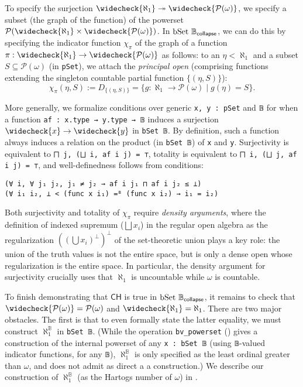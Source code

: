 \documentclass[sigplan,10pt,review, anonymous]{acmart}
\newcommand{\lil}{\lstinline}
\newcommand{\CH}{\mathsf{CH}}
\theoremstyle{definition}
\begin{document}
To specify the surjection \(\widecheck{\aleph_1} \twoheadrightarrow \widecheck{\mathcal{P}(\omega)}\), we specify a subset (the graph of the function) of the powerset \(\mathcal{P}(\widecheck{\aleph_1} \times \widecheck{\mathcal{P}(\omega)})\).
In \(\text{\lil{bSet}}\ \mathbb{B}_{\mathsf{collapse}}\), we can do this by specifying the indicator function \(\chi_{\pi}\) of the graph of a function \(\pi : \widecheck{\aleph_1} \to \widecheck{\mathcal{P}(\omega)}\) as follows: to an \(\eta < \aleph_1\) and a subset \(S \subseteq \mathcal{P}(\omega)\) (in \lil{pSet}), we attach the \emph{principal open} (comprising functions extending the singleton countable partial function \(\{(\eta, S)\}\)):
\[
  \chi_\pi (\eta, S) := D_{\{(\eta, S)\}} = \{g : \aleph_1 \to \mathcal{P}(\omega) \operatorname{|} g (\eta) = S\}.
\]

More generally, we formalize conditions over generic \lil{x, y : pSet} and \lil{𝔹} for when a function \lil{af : x.type → y.type → 𝔹} induces a surjection \(\widecheck{x} \to \widecheck{y}\) in \lil{bSet 𝔹}.
By definition, such a function always induces a relation on the product (in \lil{bSet 𝔹}) of \lil{x} and \lil{y}.
Surjectivity is equivalent to \lil{⨅ j, (⨆ i, af i j) = ⊤}, totality is equivalent to \lil{⨅ i, (⨆ j, af i j) = ⊤}, and well-definedness follows from conditions:
\begin{lstlisting}
(∀ i, ∀ j₁ j₂, j₁ ≠ j₂ → af i j₁ ⊓ af i j₂ ≤ ⊥)
(∀ i₁ i₂, ⊥ < (func x i₁) =ᴮ (func x i₂) → i₁ = i₂)
\end{lstlisting}
Both surjectivity and totality of \(\chi_{\pi}\) require \emph{density arguments}, where the definition of indexed supremum (\(\bigsqcup x_i\)) in the regular open algebra as the regularization \(((\bigcup x_i)^\perp)^\perp\) of the set-theoretic union plays a key role: the union of the truth values is not the entire space, but is only a dense open whose regularization is the entire space. In particular, the density argument for surjectivity crucially uses that \(\aleph_1\) is uncountable while \(\omega\) is countable.

To finish demonstrating that \(\CH\) is true in \(\text{\lil{bSet}}\ \mathbb{B}_{\mathsf{collapse}}\), it remains to check that \(\widecheck{\mathcal{P}(\omega)} = \mathcal{P}(\omega)\) and \(\widecheck{\aleph_1} = \aleph_1\).
There are two major obstacles. The first is that to even formally state the latter equality, we must construct \(\aleph_1^{\mathbb{B}}\) in \lil{bSet 𝔹}.
(While the operation \lil{bv_powerset} () gives a construction of the internal powerset of any \lil{x : bSet 𝔹} (using \lil{𝔹}-valued indicator functions, for any \lil{𝔹}), \(\aleph_1^{\mathbb{B}}\) is only specified as the least ordinal greater than \(\omega\), and does not admit as direct a a construction.)
We describe our construction of \(\aleph_1^{\mathbb{B}}\) (as the Hartogs number of \(\omega\)) in .
\end{document}
